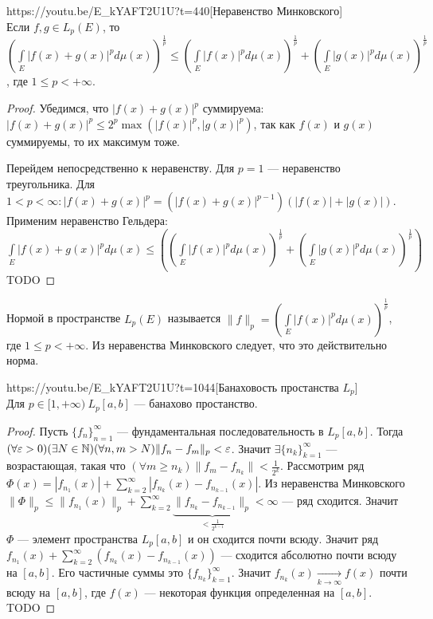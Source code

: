 \begin{linkthm}{https://youtu.be/E_kYAFT2U1U?t=440}[Неравенство Минковского]\ \\
	Если $f,g\in L_p(E)$, то $\left(\int\limits_E\left|f(x)+g(x)\right|^pd\mu(x)\right)^{\frac{1}{p}}\leqslant\left(\int\limits_E\left|f(x)\right|^pd\mu(x)\right)^{\frac{1}{p}}+\left(\int\limits_E\left|g(x)\right|^pd\mu(x)\right)^{\frac{1}{p}}$, где $1\leqslant p<+\infty$.
\end{linkthm}

\begin{proof}
	Убедимся, что $|f(x)+g(x)|^p$ суммируема: $|f(x)+g(x)|^p\leqslant 2^p\max(|f(x)|^p,|g(x)|^p)$, так как $f(x)$ и $g(x)$ суммируемы, то их максимум тоже. 
	
	Перейдем непосредственно к неравенству. Для $p=1$ --- неравенство треугольника. Для $1<p<\infty: |f(x)+g(x)|^p=\left(|f(x)+g(x)|^{p-1}\right)(|f(x)|+|g(x)|)$. Применим неравенство Гельдера: $\int\limits_E |f(x)+g(x)|^p d\mu(x)\leqslant \left(\left(\int\limits_E |f(x)|^p d\mu(x)\right)^\frac{1}{p}+\left(\int\limits_E |g(x)|^p d\mu(x)\right)^\frac{1}{p}\right)$ TODO
\end{proof}
\begin{Def}
	Нормой в пространстве $L_p(E)$ называется $\|f\|_p=\left(\int\limits_E |f(x)|^p d\mu(x)\right)^\frac{1}{p}$, где $1\leqslant p<+\infty$. Из неравенства Минковского следует, что это действительно норма.
\end{Def}
\begin{linkthm}{https://youtu.be/E_kYAFT2U1U?t=1044}[Банаховость простанства $L_p$]\ \\
	Для $p\in [1,+\infty)\  L_p[a,b]$ --- банахово простанство.
\end{linkthm}
\begin{proof}
	Пусть $\{f_n\}_{n=1}^\infty$ --- фундаментальная последовательность в $L_p[a,b]$. Тогда $(\forall\varepsilon >0)(\exists N\in \mathbb{N})(\forall n,m>N) \|f_n-f_m\|_p<\varepsilon$. Значит $\exists\{n_k\}_{k=1}^\infty$ --- возрастающая, такая что $(\forall m\geqslant n_k) \|f_m-f_{n_k}\|<\frac{1}{2^k}$. Рассмотрим ряд $\Phi(x)=|f_{n_1}(x)|+\sum\limits_{k=2}^\infty |f_{n_k}(x)-f_{n_{k-1}}(x)|$. Из неравенства Минковского $\|\Phi\|_p\leqslant \|f_{n_1}(x)\|_p+\sum\limits_{k=2}^\infty \underbrace{\|f_{n_k}-f_{n_{k-1}}\|_p}_{<\frac{1}{2^{k-1}}}<\infty$ --- ряд сходится. Значит $\Phi$ --- элемент пространства $L_p[a,b]$ и он сходится почти всюду. Значит ряд $f_{n_1}(x)+\sum\limits_{k=2}^\infty (f_{n_k}(x)-f_{n_{k-1}}(x))$ --- сходится абсолютно почти всюду на $[a,b]$. Его частичные суммы это $\{f_{n_k}\}_{k=1}^\infty$. Значит $f_{n_k}(x)\underset{k\to\infty}{\to}f(x)$ почти всюду на $[a,b]$, где $f(x)$ --- некоторая функция определенная на $[a,b]$. TODO
\end{proof}

